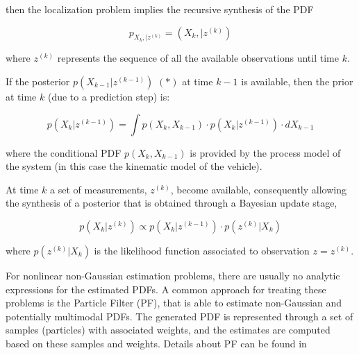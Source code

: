 then the localization problem implies the recursive synthesis of the PDF

\begin{equation}
\label{Eq::ch2-2}
p_{X_k, | z^{\left( k\right)}} = \left( X_k, | z^{\left( k\right)}\right) 
\end{equation}

where $z^{\left( k\right)}$ represents the sequence of all the available observations until time $k$.

If the posterior $p\left( X_{k-1} | z^{\left( k-1\right)}\right)$ $\left( *\right)$ at time $k-1$ is available, then the prior at time $k$ (due to a prediction step) is:

\begin{equation}
\label{Eq::ch2-3}
p\left( X_{k} | z^{\left( k-1\right)}\right) = \int  p\left( X_{k}, X_{k-1}\right) \cdotp p\left( X_{k} | z^{\left( k-1\right)}\right) \cdotp dX_{k-1}   
\end{equation}

where the conditional PDF $p\left( X_{k}, X_{k-1}\right)$ is provided by the process model of the system (in this case the kinematic model of the vehicle).

At time $k$ a set of measurements,  $z^{\left( k\right)}$, become available, consequently allowing the synthesis of a posterior that is obtained through a Bayesian update stage,

\begin{equation}
\label{Eq::ch2-4}
p\left( X_{k} | z^{\left( k\right)}\right) \propto p\left( X_{k} | z^{\left( k-1\right)}\right) \cdotp p\left( z^{\left( k\right)} | X_{k}\right)
\end{equation}

where $p\left( z^{\left( k\right)} | X_{k}\right)$ is the likelihood function associated to observation $z=z^{\left( k\right)}$.

For nonlinear non-Gaussian estimation problems, there are usually no analytic expressions for the estimated PDFs. A common approach for treating these problems is the Particle Filter (PF), that is able to estimate non-Gaussian and potentially multimodal PDFs. The generated PDF is represented through a set of samples (particles) with associated weights, and the estimates are computed based on these samples and weights. Details about PF can be found in \cite{Thrun:2005:PR:1121596, Thrun00j}
